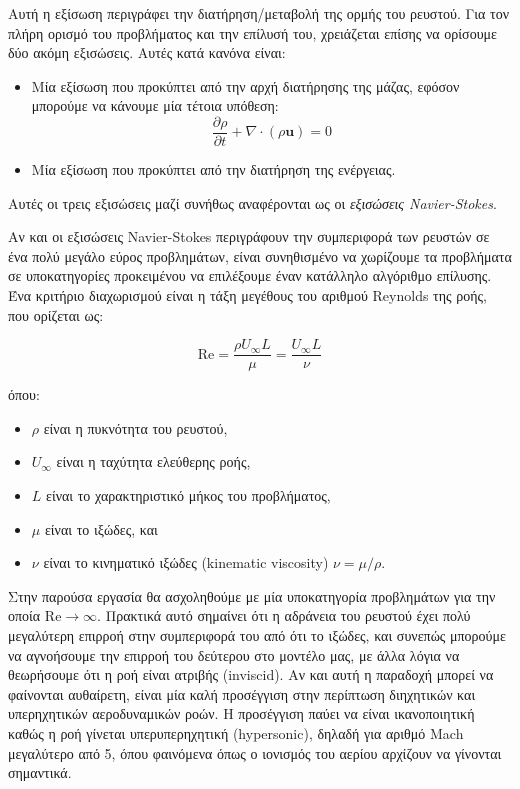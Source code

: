 Αυτή η εξίσωση περιγράφει την διατήρηση/μεταβολή της ορμής του ρευστού.
Για τον πλήρη ορισμό του προβλήματος και την επίλυσή του, χρειάζεται επίσης να ορίσουμε δύο ακόμη εξισώσεις.
Αυτές κατά κανόνα είναι:

\begin{itemize}
    \item Μία εξίσωση που προκύπτει από την αρχή διατήρησης της μάζας, εφόσον μπορούμε να κάνουμε μία τέτοια υπόθεση:
        \begin{equation*}
            \frac{\partial \rho}{\partial t} + \nabla \cdot \left( \rho \mathbf{u} \right) = 0
        \end{equation*}
    \item Μία εξίσωση που προκύπτει από την διατήρηση της ενέργειας.
\end{itemize}

Αυτές οι τρεις εξισώσεις μαζί συνήθως αναφέρονται ως οι \emph{εξισώσεις Navier-Stokes}.

Αν και οι εξισώσεις Navier-Stokes περιγράφουν την συμπεριφορά των ρευστών σε ένα πολύ μεγάλο εύρος προβλημάτων, είναι συνηθισμένο να χωρίζουμε τα προβλήματα σε υποκατηγορίες προκειμένου να επιλέξουμε έναν κατάλληλο αλγόριθμο επίλυσης.
Ένα κριτήριο διαχωρισμού είναι η τάξη μεγέθους του αριθμού Reynolds της ροής, που ορίζεται ως:

\begin{equation*}
    \mathrm{Re} = \frac{\rho U_{\infty} L}{\mu} = \frac{U_\infty L}{\nu}
\end{equation*}

όπου:

\begin{itemize}
    \item $\rho$ είναι η πυκνότητα του ρευστού,
    \item $U_{\infty}$ είναι η ταχύτητα ελεύθερης ροής,
    \item $L$ είναι το χαρακτηριστικό μήκος του προβλήματος,
    \item $\mu$ είναι το ιξώδες, και
    \item $\nu$ είναι το κινηματικό ιξώδες (kinematic viscosity) $\nu = \mu / \rho$.
\end{itemize}

Στην παρούσα εργασία θα ασχοληθούμε με μία υποκατηγορία προβλημάτων για την οποία $\mathrm{Re} \to \infty$.
Πρακτικά αυτό σημαίνει ότι η αδράνεια του ρευστού έχει πολύ μεγαλύτερη επιρροή στην συμπεριφορά του από ότι το ιξώδες, και συνεπώς μπορούμε να αγνοήσουμε την επιρροή του δεύτερου στο μοντέλο μας, με άλλα λόγια να θεωρήσουμε ότι η ροή είναι ατριβής (inviscid).
Αν και αυτή η παραδοχή μπορεί να φαίνονται αυθαίρετη, είναι μία καλή προσέγγιση στην περίπτωση διηχητικών και υπερηχητικών αεροδυναμικών ροών.
Η προσέγγιση παύει να είναι ικανοποιητική καθώς η ροή γίνεται υπερυπερηχητική (hypersonic), δηλαδή για αριθμό Mach μεγαλύτερο από 5, όπου φαινόμενα όπως ο ιονισμός του αερίου αρχίζουν να γίνονται σημαντικά.

